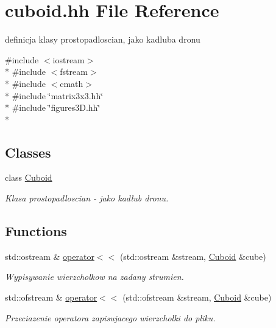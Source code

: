 \hypertarget{cuboid_8hh}{}\section{cuboid.\+hh File Reference}
\label{cuboid_8hh}


definicja klasy prostopadloscian, jako kadluba dronu  


{\ttfamily \#include $<$iostream$>$}\\*
{\ttfamily \#include $<$fstream$>$}\\*
{\ttfamily \#include $<$cmath$>$}\\*
{\ttfamily \#include \char`\"{}matrix3x3.\+hh\char`\"{}}\\*
{\ttfamily \#include \char`\"{}figures3\+D.\+hh\char`\"{}}\\*
\subsection*{Classes}
\begin{DoxyCompactItemize}
\item 
class \hyperlink{class_cuboid}{Cuboid}
\begin{DoxyCompactList}\small\item\em Klasa prostopadloscian -\/ jako kadlub dronu. \end{DoxyCompactList}\end{DoxyCompactItemize}
\subsection*{Functions}
\begin{DoxyCompactItemize}
\item 
std\+::ostream \& \hyperlink{cuboid_8hh_abbad847752c6407a34085f099a761f8f}{operator$<$$<$} (std\+::ostream \&stream, \hyperlink{class_cuboid}{Cuboid} \&cube)
\begin{DoxyCompactList}\small\item\em Wypisywanie wierzcholkow na zadany strumien. \end{DoxyCompactList}\item 
std\+::ofstream \& \hyperlink{cuboid_8hh_a71dba4254e2ec6eec0aca6f1b621d02c}{operator$<$$<$} (std\+::ofstream \&stream, \hyperlink{class_cuboid}{Cuboid} \&cube)
\begin{DoxyCompactList}\small\item\em Przeciazenie operatora zapisujacego wierzcholki do pliku. \end{DoxyCompactList}\end{DoxyCompactItemize}
